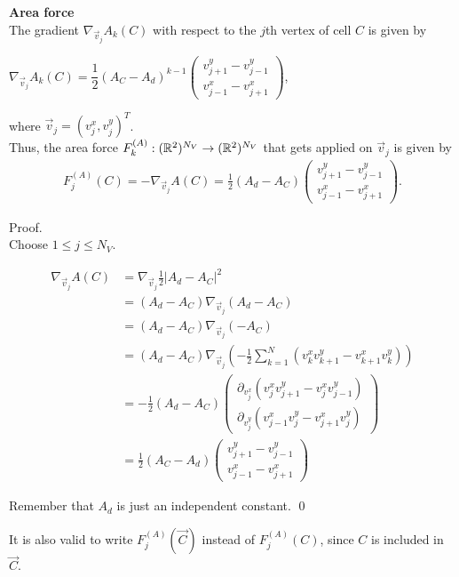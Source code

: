 \begin{proposition} \textbf{Area force} \label{force:area}\\
	The gradient $\nabla_{\vec{v}_j} A_k(C)$ with respect to the $j$th vertex of cell $C$ is given by 
	\begin{center}
		$\nabla_{\vec{v}_j} A_k(C) = \dfrac{1}{2} (A_{C} - A_d)^{k-1} \begin{pmatrix} v_{j+1}^{y} - v_{j-1}^{y} \\[0.5em]  v_{j-1}^{x} - v_{j+1}^{x} \end{pmatrix}$, 
	\end{center}
	where $\vec{v}_j = (v_{j}^{x}, v_{j}^{y})^T$. \\

	Thus, the area force $F_{k}^{(A)}: (\mathbb{R}^2)^{N_V} \rightarrow (\mathbb{R}^2)^{N_V}$ that gets applied on $\vec{v}_j$ is given by 
	\begin{align}
		F_{j}^{(A)}(C) 
		= - \nabla_{\vec{v}_j} A(C) 
		= \frac{1}{2}(A_d - A_{C}) \begin{pmatrix} v_{j+1}^{y} - v_{j-1}^{y} \\[0.5em]  v_{j-1}^{x} - v_{j+1}^{x} \end{pmatrix}.
	\end{align}
 
	Proof.\\
	Choose $1 \leq j \leq N_V$.  
 
	\begin{align*}
		\nabla_{\vec{v}_j} A(C) &= \nabla_{\vec{v}_j} \frac{1}{2} | A_d - A_{C} |^2  \\ 
		&=  (A_d - A_{C}) \nabla_{\vec{v}_j} (A_d - A_{C}) \\
		&=   (A_d - A_{C}) \nabla_{\vec{v}_j} ( - A_{C}) \\ 
		&=   (A_d - A_{C}) \nabla_{\vec{v}_j} ( - \frac{1}{2} \sum\limits_{k = 1}^{N} (v_k^{x} v_{k+1}^{y} - v_{k+1}^{x} v_k^{y})) \\[0.5em]  
		&=   - \frac{1}{2} (A_d - A_{C}) \begin{pmatrix}
			\partial_{v_j^{x}} (v_j^{x} v_{j+1}^{y} - v_j^{x} v_{j-1}^{y})  \\[0.5em]
			\partial_{v_j^{y}} (v_{j-1}^{x} v_j^{y} - v_{j+1}^{x} v_j^{y})
		\end{pmatrix} \\[0.5em] 
		&=   \frac{1}{2} (A_{C} - A_d) \begin{pmatrix}
			  v_{j+1}^{y} - v_{j-1}^{y}  \\
			 v_{j-1}^{x}  - v_{j+1}^{x} 
		\end{pmatrix} 
	\end{align*}

	Remember that $A_d$ is just an independent constant. 
	\qed
\end{proposition}
It is also valid to write $F_{j}^{(A)}(\vec{C})$ instead of $F_{j}^{(A)}(C)$, since $C$ is included in $\vec{C}$. 


